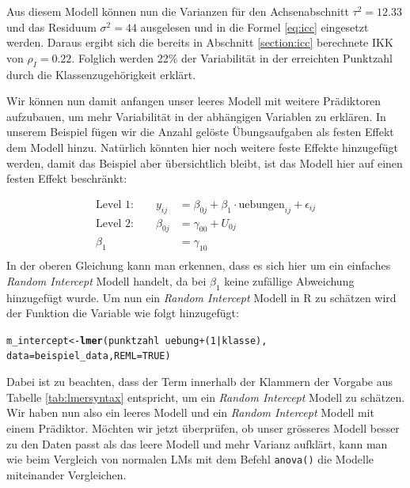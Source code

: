 \documentclass[12pt]{article}\usepackage[]{graphicx}\usepackage[]{color}
\makeatletter
\newcommand{\hlnum}[1]{\textcolor[rgb]{0.686,0.059,0.569}{#1}}%
\newcommand{\hlopt}[1]{\textcolor[rgb]{0,0,0}{#1}}%
\newcommand{\hlstd}[1]{\textcolor[rgb]{0.345,0.345,0.345}{#1}}%
\newcommand{\hlkwb}[1]{\textcolor[rgb]{0.69,0.353,0.396}{#1}}%
\newcommand{\hlkwc}[1]{\textcolor[rgb]{0.333,0.667,0.333}{#1}}%
\newcommand{\hlkwd}[1]{\textcolor[rgb]{0.737,0.353,0.396}{\textbf{#1}}}%
\newenvironment{kframe}{%
 \def\at@end@of@kframe{}%
 \ifinner\ifhmode%
  \def\at@end@of@kframe{\end{minipage}}%
  \begin{minipage}{\columnwidth}%
 \fi\fi%
 \def\FrameCommand##1{\hskip\@totalleftmargin \hskip-\fboxsep
 \colorbox{shadecolor}{##1}\hskip-\fboxsep
     \hskip-\linewidth \hskip-\@totalleftmargin \hskip\columnwidth}%
 \MakeFramed {\advance\hsize-\width
   \@totalleftmargin\z@ \linewidth\hsize
   \@setminipage}}%
 {\par\unskip\endMakeFramed%
 \at@end@of@kframe}
\newenvironment{knitrout}{}{} %
\makeatother
\begin{document}
Aus diesem Modell können nun die Varianzen für den Achsenabschnitt $\tau^2 = 12.33$ und das Residuum $\sigma^2 = 44$ ausgelesen und in die Formel \eqref{eq:icc} eingesetzt werden. Daraus ergibt sich die bereits in Abschnitt \ref{section:icc} berechnete IKK von $\rho_I = 0.22$. Folglich werden 22\% der Variabilität in der erreichten Punktzahl durch die Klassenzugehörigkeit erklärt.

Wir können nun damit anfangen unser leeres Modell mit weitere Prädiktoren aufzubauen, um mehr Variabilität in der abhängigen Variablen zu erklären. In unserem Beispiel fügen wir die Anzahl gelöste Übungsaufgaben als festen Effekt dem Modell hinzu. Natürlich könnten hier noch weitere feste Effekte hinzugefügt werden, damit das Beispiel aber übersichtlich bleibt, ist das Modell hier auf einen festen Effekt beschränkt:

\begin{equation}
\begin{split}	
 \text{Level 1:}  \qquad y_{ij} & = \beta_{0j} + \beta_{1} \cdot \text{uebungen}_{ij} + \epsilon_{ij}\\
 \text{Level 2:} \qquad \beta_{0j} & = \gamma_{00} + U_{0j}\\
 \beta_{1} & = \gamma_{10}\\
\end{split}	
\end{equation} 
In der oberen Gleichung kann man erkennen, dass es sich hier um ein einfaches \textit{Random Intercept} Modell handelt, da bei $\beta_{1}$ keine zufällige Abweichung hinzugefügt wurde. Um nun ein \textit{Random Intercept} Modell in R zu schätzen wird der Funktion die Variable wie folgt hinzugefügt:

\singlespacing
\begin{knitrout}
\color{fgcolor}\begin{kframe}
\begin{alltt}
\hlstd{m_intercept} \hlkwb{<-} \hlkwd{lmer}\hlstd{(punktzahl} \hlopt{~} \hlstd{uebung} \hlopt{+} \hlstd{(}\hlnum{1} \hlopt{|} \hlstd{klasse),}
        \hlkwc{data} \hlstd{= beispiel_data,} \hlkwc{REML} \hlstd{=} \hlnum{TRUE}\hlstd{)}
\end{alltt}
\end{kframe}
\end{knitrout}

Dabei ist zu beachten, dass der Term innerhalb der Klammern der Vorgabe aus Tabelle \ref{tab:lmersyntax} entspricht, um ein \textit{Random Intercept} Modell zu schätzen. Wir haben nun also ein leeres Modell und ein \textit{Random Intercept} Modell mit einem Prädiktor. Möchten wir jetzt überprüfen, ob unser grösseres Modell besser zu den Daten passt als das leere Modell und mehr Varianz aufklärt, kann man wie beim Vergleich von normalen LMs mit dem Befehl \texttt{anova()} die Modelle miteinander Vergleichen. 
\end{document}
